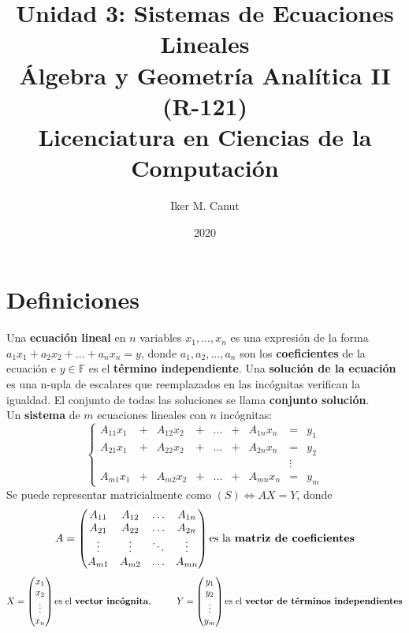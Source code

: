 \documentclass[11pt,a4paper]{article}
\author{Iker M. Canut}
\title{Unidad 3: Sistemas de Ecuaciones Lineales\\ \'Algebra y Geometr\'ia Anal\'itica II (R-121)\\Licenciatura en Ciencias de la Computaci\'on}
\date{2020}
\begin{document}
\maketitle
\newpage

\section{Definiciones}
Una \textbf{ecuaci\'on lineal} en $n$ variables $x_1, ..., x_n$ es una expresi\'on de la forma $a_1x_1 + a_2x_2 + ... + a_nx_n = y$, donde $a_1, a_2, ..., a_n$ son los \textbf{coeficientes} de la ecuaci\'on e $y \in \mathbb{F}$ es el \textbf{t\'ermino independiente}. Una \textbf{soluci\'on de la ecuaci\'on} es una n-upla de escalares que reemplazados en las inc\'ognitas verifican la igualdad. El conjunto de todas las soluciones se llama \textbf{conjunto soluci\'on}.\\
Un \textbf{sistema} de $m$ ecuaciones lineales con $n$ inc\'ognitas:
\[
\left\{
\begin{array}{ccccccccc}
A_{11} x_1 &+& A_{12} x_2 &+& ... &+& A_{1n} x_n &=& y_1\\
A_{21} x_1 &+& A_{22} x_2 &+& ... &+& A_{2n} x_n &=& y_2\\
&&&&&&&\vdots\\
A_{m1} x_1 &+& A_{m2} x_2 &+& ... &+& A_{mn} x_n &=& y_m
\end{array}
\right.
\]
Se puede representar matricialmente como $(S) \Longleftrightarrow AX = Y$, donde \\
$$A = 
\begin{pmatrix}
A_{11} & A_{12} & \hdots & A_{1n} \\
A_{21} & A_{22} & \hdots & A_{2n} \\
\vdots & \vdots & \ddots & \vdots \\
A_{m1} & A_{m2} & \hdots & A_{mn}
\end{pmatrix}\text{es la \textbf{matriz de coeficientes}}$$
$$X = 
\begin{pmatrix}
x_1 \\
x_2\\
\vdots\\
x_n
\end{pmatrix} \text{es el \textbf{vector inc\'ognita}}, \ \ \ \ \ \ \ \ Y = 
\begin{pmatrix}
y_1 \\
y_2\\
\vdots\\
y_m
\end{pmatrix} \text{es el \textbf{vector de t\'erminos independientes}}$$
\end{document}
